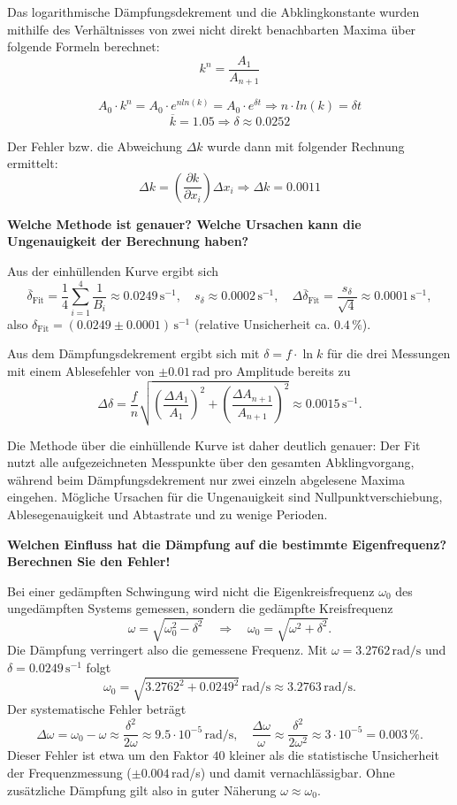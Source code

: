 \documentclass[
  headings=optiontotocandhead,
  twoside,
  openright,
  numbers=noenddot,
  toc=flat,
  11pt,
  parskip=full,
  listof=flat,
  bibliography=totoc,
  a4paper,
  DIV=14,
  BCOR=22mm,
  headheight=5mm,
  headinclude=true,
]{scrartcl}
\begin{document}
Das logarithmische Dämpfungsdekrement und die Abklingkonstante wurden mithilfe des Verhältnisses von zwei nicht direkt benachbarten Maxima über folgende Formeln berechnet:
$$ k^n = \frac{A_1}{A_{n+1}} $$

$$ A_0 \cdot k^n = A_0 \cdot e^{n ln(k)} = A_0 \cdot e^{\delta t} \Rightarrow n \cdot ln(k) = \delta t $$
$$ \overline{k} = 1.05 \Rightarrow \delta \approx 0.0252 $$ 

Der Fehler bzw. die Abweichung $\Delta k$ wurde dann mit folgender Rechnung ermittelt:
$$ \Delta k = (\frac{\partial k}{\partial x_i}) \Delta x_i \Rightarrow \Delta k = 0.0011 $$

\textbf{Welche Methode ist genauer? Welche Ursachen kann die Ungenauigkeit der Berechnung haben?}

Aus der einhüllenden Kurve ergibt sich
$$ \overline{\delta}_{\text{Fit}} = \frac{1}{4}\sum_{i=1}^{4} \frac{1}{B_i} \approx 0.0249 \, \text{s}^{-1}, \quad
   s_\delta \approx 0.0002 \, \text{s}^{-1}, \quad \Delta\overline{\delta}_{\text{Fit}} = \frac{s_\delta}{\sqrt{4}} \approx 0.0001 \, \text{s}^{-1}, $$
also $\delta_{\text{Fit}} = (0.0249 \pm 0.0001)\,\text{s}^{-1}$ (relative Unsicherheit ca. $0.4\,\%$).

Aus dem Dämpfungsdekrement ergibt sich mit $\delta = f \cdot \ln k$ für die drei Messungen mit einem Ablesefehler von $\pm 0.01$\,rad pro Amplitude bereits zu
$$ \Delta\delta = \frac{f}{n}\sqrt{\left(\frac{\Delta A_1}{A_1}\right)^2 + \left(\frac{\Delta A_{n+1}}{A_{n+1}}\right)^2} \approx 0.0015 \, \text{s}^{-1}. $$

Die Methode über die einhüllende Kurve ist daher deutlich genauer: Der Fit nutzt alle aufgezeichneten Messpunkte über den gesamten Abklingvorgang, während beim Dämpfungsdekrement nur zwei einzeln abgelesene Maxima eingehen. Mögliche Ursachen für die Ungenauigkeit sind Nullpunktverschiebung, Ablesegenauigkeit und Abtastrate und zu wenige Perioden.

\textbf{Welchen Einfluss hat die Dämpfung auf die bestimmte Eigenfrequenz? Berechnen Sie den Fehler!}

Bei einer gedämpften Schwingung wird nicht die Eigenkreisfrequenz $\omega_0$ des ungedämpften Systems gemessen, sondern die gedämpfte Kreisfrequenz
$$ \omega = \sqrt{\omega_0^2 - \delta^2} \quad \Rightarrow \quad \omega_0 = \sqrt{\omega^2 + \delta^2}. $$
Die Dämpfung verringert also die gemessene Frequenz. Mit $\omega = 3.2762\,\text{rad/s}$ und $\delta = 0.0249\,\text{s}^{-1}$ folgt
$$ \omega_0 = \sqrt{3.2762^2 + 0.0249^2}\,\text{rad/s} \approx 3.2763 \, \text{rad/s}. $$
Der systematische Fehler beträgt
$$ \Delta\omega = \omega_0 - \omega \approx \frac{\delta^2}{2\omega} \approx 9.5 \cdot 10^{-5} \, \text{rad/s}, \quad
   \frac{\Delta\omega}{\omega} \approx \frac{\delta^2}{2\omega^2} \approx 3 \cdot 10^{-5} = 0.003\,\%. $$
Dieser Fehler ist etwa um den Faktor $40$ kleiner als die statistische Unsicherheit der Frequenzmessung ($\pm 0.004$\,rad/s) und damit vernachlässigbar. Ohne zusätzliche Dämpfung gilt also in guter Näherung $\omega \approx \omega_0$.
\end{document}
